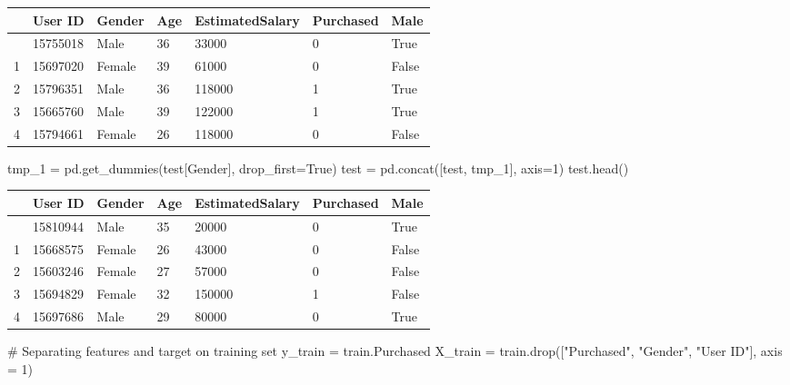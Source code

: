 \documentclass[
  letterpaper,
  DIV=11,
  numbers=noendperiod]{scrreprt}
\newenvironment{Shaded}{\begin{snugshade}}{\end{snugshade}}
\newcommand{\CommentTok}[1]{\textcolor[rgb]{0.37,0.37,0.37}{#1}}
\newcommand{\DecValTok}[1]{\textcolor[rgb]{0.68,0.00,0.00}{#1}}
\newcommand{\NormalTok}[1]{\textcolor[rgb]{0.00,0.23,0.31}{#1}}
\newcommand{\OperatorTok}[1]{\textcolor[rgb]{0.37,0.37,0.37}{#1}}
\newcommand{\StringTok}[1]{\textcolor[rgb]{0.13,0.47,0.30}{#1}}
\newcommand{\VariableTok}[1]{\textcolor[rgb]{0.07,0.07,0.07}{#1}}
\begin{document}
\begin{longtable}[]{@{}lllllll@{}}
\toprule\noalign{}
& User ID & Gender & Age & EstimatedSalary & Purchased & Male \\
\midrule\noalign{}
\endhead
\bottomrule\noalign{}
\endlastfoot
0 & 15755018 & Male & 36 & 33000 & 0 & True \\
1 & 15697020 & Female & 39 & 61000 & 0 & False \\
2 & 15796351 & Male & 36 & 118000 & 1 & True \\
3 & 15665760 & Male & 39 & 122000 & 1 & True \\
4 & 15794661 & Female & 26 & 118000 & 0 & False \\
\end{longtable}

\begin{Shaded}
\begin{Highlighting}[]
\NormalTok{tmp\_1 }\OperatorTok{=}\NormalTok{ pd.get\_dummies(test[}\StringTok{\textquotesingle{}Gender\textquotesingle{}}\NormalTok{], drop\_first}\OperatorTok{=}\VariableTok{True}\NormalTok{)}
\NormalTok{test }\OperatorTok{=}\NormalTok{ pd.concat([test, tmp\_1], axis}\OperatorTok{=}\DecValTok{1}\NormalTok{)}
\NormalTok{test.head()}
\end{Highlighting}
\end{Shaded}

\begin{longtable}[]{@{}lllllll@{}}
\toprule\noalign{}
& User ID & Gender & Age & EstimatedSalary & Purchased & Male \\
\midrule\noalign{}
\endhead
\bottomrule\noalign{}
\endlastfoot
0 & 15810944 & Male & 35 & 20000 & 0 & True \\
1 & 15668575 & Female & 26 & 43000 & 0 & False \\
2 & 15603246 & Female & 27 & 57000 & 0 & False \\
3 & 15694829 & Female & 32 & 150000 & 1 & False \\
4 & 15697686 & Male & 29 & 80000 & 0 & True \\
\end{longtable}

\begin{Shaded}
\begin{Highlighting}[]
\CommentTok{\# Separating features and target on training set}
\NormalTok{y\_train }\OperatorTok{=}\NormalTok{ train.Purchased}
\NormalTok{X\_train }\OperatorTok{=}\NormalTok{ train.drop([}\StringTok{"Purchased"}\NormalTok{, }\StringTok{"Gender"}\NormalTok{, }\StringTok{"User ID"}\NormalTok{], axis }\OperatorTok{=} \DecValTok{1}\NormalTok{)}
\end{Highlighting}
\end{Shaded}
\end{document}
